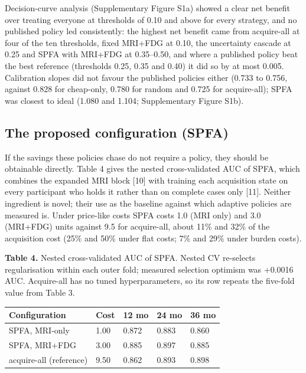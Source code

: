 \documentclass[12pt,twoside]{article}
\begin{document}
\begin{spacing}{1.0}
Decision-curve analysis (Supplementary Figure S1a) showed a clear net benefit over treating everyone at
thresholds of 0.10 and above for every strategy, and no published policy led consistently: the highest net
benefit came from acquire-all at four of the ten thresholds, fixed MRI+FDG at 0.10, the uncertainty cascade at
0.25 and SPFA with MRI+FDG at 0.35--0.50, and where a published policy beat the best reference (thresholds
0.25, 0.35 and 0.40) it did so by at most 0.005. Calibration slopes did not favour the published policies
either (0.733 to 0.756, against 0.828 for cheap-only, 0.780 for random and 0.725 for acquire-all); SPFA was
closest to ideal (1.080 and 1.104; Supplementary Figure S1b).




\subsection{The proposed configuration (SPFA)}
If the savings these policies chase do not require a policy, they should be
obtainable directly. Table 4 gives the nested cross-validated AUC of SPFA,
which combines the expanded MRI block [10] with training each acquisition
state on every participant who holds it rather than on complete cases only
[11]. Neither ingredient is novel; their use as the baseline against which
adaptive policies are measured is. Under price-like costs SPFA costs 1.0 (MRI only) and 3.0 (MRI+FDG) units
against 9.5 for acquire-all, about 11\% and 32\% of the acquisition cost
(25\% and 50\% under flat costs; 7\% and 29\% under burden costs).

\begin{table}[!htbp]
\centering
\textbf{Table 4.} Nested cross-validated AUC of SPFA. Nested CV re-selects
regularisation within each outer fold; measured selection optimism was
+0.0016 AUC. Acquire-all has no tuned hyperparameters, so its row repeats the
five-fold value from Table 3.\\\vspace{5pt}
\begin{tabular}{|M{4.4cm}|M{1.5cm}|M{1.6cm}|M{1.6cm}|M{1.6cm}|}
\hline
\textbf{Configuration} & \textbf{Cost} & \textbf{12 mo} & \textbf{24 mo} & \textbf{36 mo} \\
\hline
SPFA, MRI-only & 1.00 & 0.872 & 0.883 & 0.860 \\\hline
SPFA, MRI+FDG & 3.00 & 0.885 & 0.897 & 0.885 \\\hline
acquire-all (reference) & 9.50 & 0.862 & 0.893 & 0.898 \\\hline
\end{tabular}
\end{table}


\end{spacing}
\end{document}

